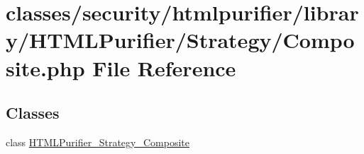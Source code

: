 \hypertarget{Strategy_2Composite_8php}{\section{classes/security/htmlpurifier/library/\+H\+T\+M\+L\+Purifier/\+Strategy/\+Composite.php File Reference}
\label{Strategy_2Composite_8php}
}
\subsection*{Classes}
\begin{DoxyCompactItemize}
\item 
class \hyperlink{classHTMLPurifier__Strategy__Composite}{H\+T\+M\+L\+Purifier\+\_\+\+Strategy\+\_\+\+Composite}
\end{DoxyCompactItemize}
